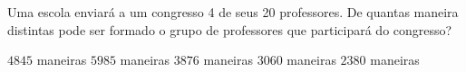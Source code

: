 Uma escola enviará a um congresso 4 de seus 20 professores. De quantas maneira distintas pode ser formado o grupo de professores que participará do congresso? 

$4845$ maneiras
$5985$ maneiras
$3876$ maneiras
$3060$ maneiras
$2380$ maneiras


